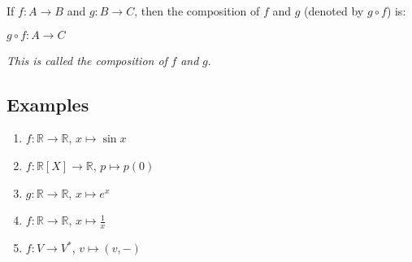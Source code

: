 \documentclass[12pt,a4paper]{article}
\begin{document}
If $f: A \to B$ and $g: B \to C$, then the composition of $f$ and $g$ (denoted by $g \circ f$) is:

\begin{center}
$g \circ f: A \to C$
\end{center}

\textit{This is called the composition of} $f$ \textit{and} $g$.

\subsection{Examples}
\begin{enumerate}
\item $f: \mathbb{R} \to \mathbb{R}$, $x \mapsto \sin x$
\item $f: \mathbb{R}[X] \to \mathbb{R}$, $p \mapsto p(0)$
\item $g: \mathbb{R} \to \mathbb{R}$, $x \mapsto e^x$
\item $f: \mathbb{R} \to \mathbb{R}$, $x \mapsto \frac{1}{x}$
\item $f: V \to V^*$, $v \mapsto (v,-)$
\end{enumerate}
\end{document}
